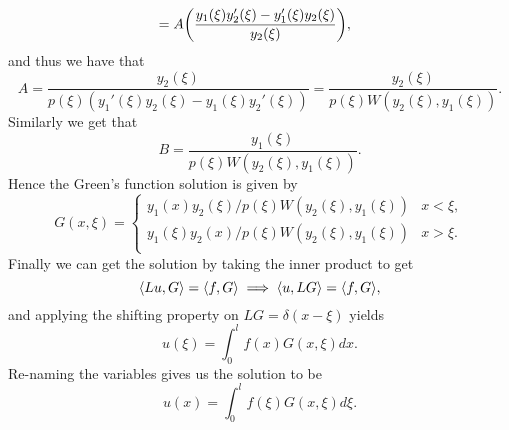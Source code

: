 \documentclass[12pt]{report}
\begin{document}
\begin{solution}
\begin{align*}
        &= A{\left( \frac{y_1(\xi)y_2'(\xi) - y_1'(\xi)y_2(\xi)}{y_2(\xi)}\right)},
    \end{align*}
    and thus we have that
    \[ 
        A = \frac{y_2(\xi)}{p(\xi)(y_1'(\xi)y_2(\xi) - y_1(\xi)y_2'(\xi))} = \frac{y_2(\xi)}{p(\xi)W(y_2(\xi),y_1(\xi))}.
    \]
    Similarly we get that
    \[ 
        B = \frac{y_1(\xi)}{p(\xi)W(y_2(\xi), y_1(\xi))}.
    \]
    Hence the Green's function solution is given by
    \[ 
        G(x,\xi) = \begin{cases}
            y_1(x)y_2(\xi)/p(\xi)W(y_2(\xi),y_1(\xi)) & x < \xi,\\
            y_1(\xi)y_2(x)/p(\xi)W(y_2(\xi),y_1(\xi)) & x > \xi.\\
        \end{cases}
    \]
    Finally we can get the solution by taking the inner product to get
    \[ 
        {\left\langle Lu,G\right\rangle} = {\left\langle f,G\right\rangle} \implies {\left\langle u,LG\right\rangle} = {\left\langle f,G\right\rangle},
    \]
    and applying the shifting property on $LG = \delta(x - \xi)$ yields
    \[ 
        u(\xi) = \int_0^l f(x)G(x,\xi)dx.
    \]
    Re-naming the variables gives us the solution to be
    \[ 
        u(x) = \int_0^l f(\xi)G(x,\xi)d\xi.
    \]

\end{solution}

\newpage
\end{document}
